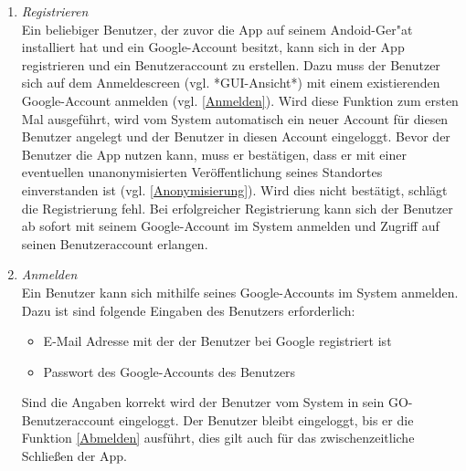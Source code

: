 \documentclass[parskip=full]{scrartcl}
\def\threedigits#1{%
  \ifnum#1<100 0\fi
  \ifnum#1<10 0\fi
  \number#1}
\begin{document}
\begin{enumerate}[label={\textbf{/F\protect\threedigits{\theenumi}0/}}, leftmargin=*]
	
	\item \textit{Registrieren}\label{Registrieren} \\ Ein beliebiger Benutzer, der zuvor die App auf seinem Andoid-Ger"at installiert hat und ein Google-Account besitzt, kann sich in der App registrieren und ein Benutzeraccount zu erstellen. Dazu muss der Benutzer sich auf dem Anmeldescreen (vgl. *GUI-Ansicht*) mit einem existierenden Google-Account anmelden (vgl. \ref{Anmelden}). Wird diese Funktion zum ersten Mal ausgeführt, wird vom System automatisch ein neuer Account für diesen Benutzer angelegt und der Benutzer in diesen Account eingeloggt. Bevor der Benutzer die App nutzen kann, muss er bestätigen, dass er mit einer eventuellen unanonymisierten Veröffentlichung seines Standortes einverstanden ist (vgl. \ref{Anonymisierung}). Wird dies nicht bestätigt, schlägt die Registrierung fehl.
	Bei erfolgreicher Registrierung kann sich der Benutzer ab sofort mit seinem Google-Account im System anmelden und Zugriff auf seinen Benutzeraccount erlangen.

	 	
	\item \textit{Anmelden} \label{Anmelden} \\ Ein Benutzer kann sich mithilfe seines Google-Accounts im System anmelden. Dazu ist sind folgende Eingaben des Benutzers erforderlich:
	\begin{itemize}
		\item E-Mail Adresse mit der der Benutzer bei Google registriert ist
		\item Passwort des Google-Accounts des Benutzers
	\end{itemize}
	Sind die Angaben korrekt wird der Benutzer vom System in sein GO-Benutzeraccount eingeloggt. Der Benutzer bleibt eingeloggt, bis er die Funktion \ref{Abmelden} ausführt, dies gilt auch für das zwischenzeitliche Schließen der App.
	
	

\end{enumerate}
\end{document}
